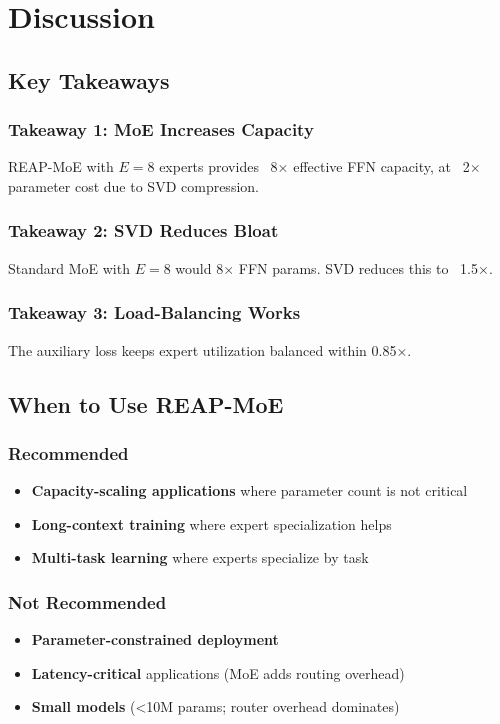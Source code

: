 \section{Discussion}

\subsection{Key Takeaways}

\subsubsection{Takeaway 1: MoE Increases Capacity}

REAP-MoE with $E = 8$ experts provides ~8$\times$ effective FFN capacity, at ~2$\times$ 
parameter cost due to SVD compression.

\subsubsection{Takeaway 2: SVD Reduces Bloat}

Standard MoE with $E = 8$ would 8$\times$ FFN params. SVD reduces this to ~1.5$\times$.

\subsubsection{Takeaway 3: Load-Balancing Works}

The auxiliary loss keeps expert utilization balanced within 0.85$\times$.

\subsection{When to Use REAP-MoE}

\subsubsection{Recommended}
\begin{itemize}
\item \textbf{Capacity-scaling applications} where parameter count is not critical
\item \textbf{Long-context training} where expert specialization helps
\item \textbf{Multi-task learning} where experts specialize by task

\end{itemize}
\subsubsection{Not Recommended}
\begin{itemize}
\item \textbf{Parameter-constrained deployment}
\item \textbf{Latency-critical} applications (MoE adds routing overhead)
\item \textbf{Small models} (\textless{}10M params; router overhead dominates)

\end{itemize}
